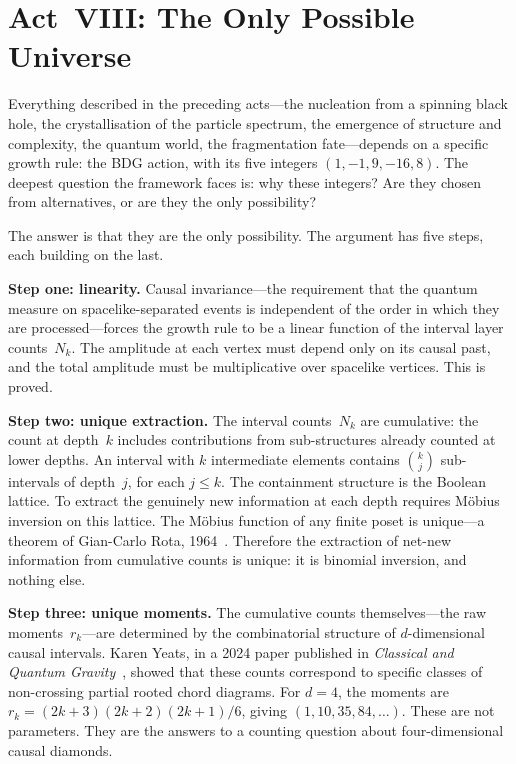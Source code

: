 \documentclass[12pt,a4paper]{article}
\begin{document}
\section{Act~VIII: The Only Possible Universe}

Everything described in the preceding acts---the nucleation from a spinning black hole, the crystallisation of the particle spectrum, the emergence of structure and complexity, the quantum world, the fragmentation fate---depends on a specific growth rule: the BDG action, with its five integers $(1, -1, 9, -16, 8)$. The deepest question the framework faces is: why these integers? Are they chosen from alternatives, or are they the only possibility?

The answer is that they are the only possibility. The argument has five steps, each building on the last.

\textbf{Step one: linearity.} Causal invariance---the requirement that the quantum measure on spacelike-separated events is independent of the order in which they are processed---forces the growth rule to be a linear function of the interval layer counts~$N_k$. The amplitude at each vertex must depend only on its causal past, and the total amplitude must be multiplicative over spacelike vertices. This is proved.

\textbf{Step two: unique extraction.} The interval counts~$N_k$ are cumulative: the count at depth~$k$ includes contributions from sub-structures already counted at lower depths. An interval with $k$ intermediate elements contains $\binom{k}{j}$ sub-intervals of depth~$j$, for each $j \leq k$. The containment structure is the Boolean lattice. To extract the genuinely new information at each depth requires M\"obius inversion on this lattice. The M\"obius function of any finite poset is unique---a theorem of Gian-Carlo Rota, 1964~\cite{Rota1964}. Therefore the extraction of net-new information from cumulative counts is unique: it is binomial inversion, and nothing else.

\textbf{Step three: unique moments.} The cumulative counts themselves---the raw moments~$r_k$---are determined by the combinatorial structure of $d$-dimensional causal intervals. Karen Yeats, in a 2024 paper published in \emph{Classical and Quantum Gravity}~\cite{Yeats2025}, showed that these counts correspond to specific classes of non-crossing partial rooted chord diagrams. For $d=4$, the moments are $r_k = (2k+3)(2k+2)(2k+1)/6$, giving $(1, 10, 35, 84, \ldots)$. These are not parameters. They are the answers to a counting question about four-dimensional causal diamonds.
\end{document}
